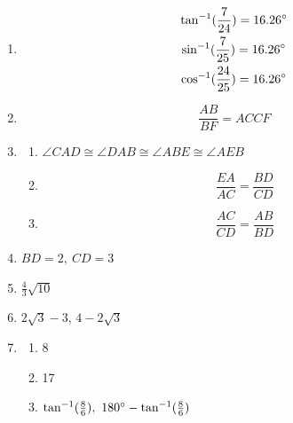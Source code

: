 \documentclass{article}
\begin{document}
\begin{enumerate}
\begin{enumerate}
	\item Yes, the slope of $y = \frac{x}{2}$ is less than half the slope of $y = \frac{4x}{3}$.
	
	\end{enumerate}
	
\item \begin{gather*}
	\tan^{-1} (\frac{7}{24}) = 16.26 \degree \\
	\sin^{-1} (\frac{7}{25}) = 16.26 \degree \\
	\cos^{-1} (\frac{24}{25}) = 16.26 \degree
	\end{gather*}
	
\item \begin{equation*}
	\frac{AB}{BF} = {AC}{CF} 
	\end{equation*}
	
\item
	
	\begin{enumerate}
	
	\item $\angle CAD \cong \angle DAB \cong \angle ABE \cong \angle AEB$
	
	\item \begin{equation*}
		\frac{EA}{AC} = \frac{BD}{CD}
		\end{equation*}
		
	\item \begin{equation*}
		\frac{AC}{CD} = \frac{AB}{BD}
		\end{equation*}
	
	\end{enumerate}
	
\item $BD = 2, \ CD = 3$
	
\item $\frac{4}{3}\sqrt{10}$
	
\item $2\sqrt{3} - 3$, $4 - 2\sqrt{3}$

\item

	\begin{enumerate}
	
	\item 8
	
	\item 17
	
	\item $\tan^{-1} (\frac{8}{6}), \ 180\degree - \tan^{-1} (\frac{8}{6})$
	

\end{enumerate}
\end{enumerate}
\end{document}
